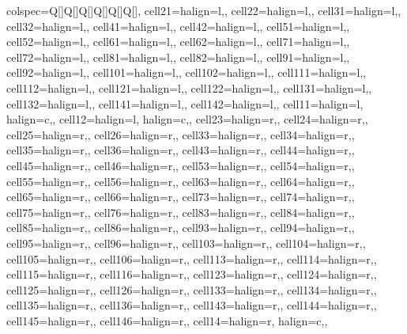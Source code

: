 \begin{table}
\centering
\begin{talltblr}[         %
caption={Descriptive statistics of respondent characteristics, by treatment group status (exposure experiment)\label{tab:balance-table-exposure-experiment}},
]                     %
{                     %
colspec={Q[]Q[]Q[]Q[]Q[]Q[]},
cell{2}{1}={}{halign=l,},
cell{2}{2}={}{halign=l,},
cell{3}{1}={}{halign=l,},
cell{3}{2}={}{halign=l,},
cell{4}{1}={}{halign=l,},
cell{4}{2}={}{halign=l,},
cell{5}{1}={}{halign=l,},
cell{5}{2}={}{halign=l,},
cell{6}{1}={}{halign=l,},
cell{6}{2}={}{halign=l,},
cell{7}{1}={}{halign=l,},
cell{7}{2}={}{halign=l,},
cell{8}{1}={}{halign=l,},
cell{8}{2}={}{halign=l,},
cell{9}{1}={}{halign=l,},
cell{9}{2}={}{halign=l,},
cell{10}{1}={}{halign=l,},
cell{10}{2}={}{halign=l,},
cell{11}{1}={}{halign=l,},
cell{11}{2}={}{halign=l,},
cell{12}{1}={}{halign=l,},
cell{12}{2}={}{halign=l,},
cell{13}{1}={}{halign=l,},
cell{13}{2}={}{halign=l,},
cell{14}{1}={}{halign=l,},
cell{14}{2}={}{halign=l,},
cell{1}{1}={}{halign=l, halign=c,},
cell{1}{2}={}{halign=l, halign=c,},
cell{2}{3}={}{halign=r,},
cell{2}{4}={}{halign=r,},
cell{2}{5}={}{halign=r,},
cell{2}{6}={}{halign=r,},
cell{3}{3}={}{halign=r,},
cell{3}{4}={}{halign=r,},
cell{3}{5}={}{halign=r,},
cell{3}{6}={}{halign=r,},
cell{4}{3}={}{halign=r,},
cell{4}{4}={}{halign=r,},
cell{4}{5}={}{halign=r,},
cell{4}{6}={}{halign=r,},
cell{5}{3}={}{halign=r,},
cell{5}{4}={}{halign=r,},
cell{5}{5}={}{halign=r,},
cell{5}{6}={}{halign=r,},
cell{6}{3}={}{halign=r,},
cell{6}{4}={}{halign=r,},
cell{6}{5}={}{halign=r,},
cell{6}{6}={}{halign=r,},
cell{7}{3}={}{halign=r,},
cell{7}{4}={}{halign=r,},
cell{7}{5}={}{halign=r,},
cell{7}{6}={}{halign=r,},
cell{8}{3}={}{halign=r,},
cell{8}{4}={}{halign=r,},
cell{8}{5}={}{halign=r,},
cell{8}{6}={}{halign=r,},
cell{9}{3}={}{halign=r,},
cell{9}{4}={}{halign=r,},
cell{9}{5}={}{halign=r,},
cell{9}{6}={}{halign=r,},
cell{10}{3}={}{halign=r,},
cell{10}{4}={}{halign=r,},
cell{10}{5}={}{halign=r,},
cell{10}{6}={}{halign=r,},
cell{11}{3}={}{halign=r,},
cell{11}{4}={}{halign=r,},
cell{11}{5}={}{halign=r,},
cell{11}{6}={}{halign=r,},
cell{12}{3}={}{halign=r,},
cell{12}{4}={}{halign=r,},
cell{12}{5}={}{halign=r,},
cell{12}{6}={}{halign=r,},
cell{13}{3}={}{halign=r,},
cell{13}{4}={}{halign=r,},
cell{13}{5}={}{halign=r,},
cell{13}{6}={}{halign=r,},
cell{14}{3}={}{halign=r,},
cell{14}{4}={}{halign=r,},
cell{14}{5}={}{halign=r,},
cell{14}{6}={}{halign=r,},
cell{1}{4}={}{halign=r, halign=c,},
}
\end{talltblr}
\end{table}
